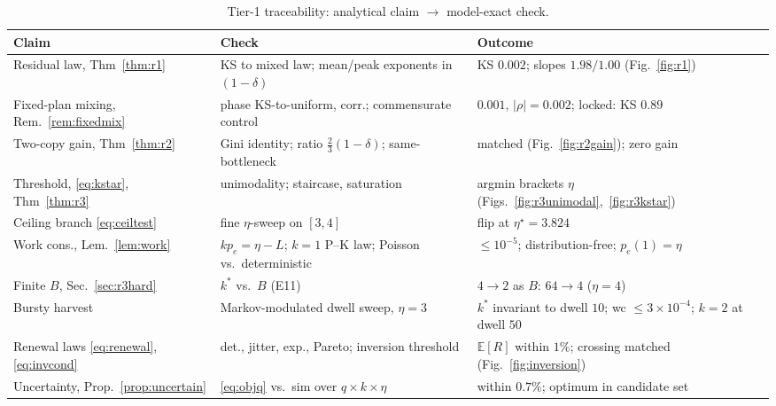 \documentclass[twocolumn,3p,times,procedia]{elsarticle}
\newcommand{\E}{\mathbb{E}}
\newcommand{\peff}{p_e}
\newcommand{\kstar}{k^{\ast}}
\begin{document}
\begin{table}[t]
\caption{Tier-1 traceability: analytical claim $\to$ model-exact check.}
\label{tab:tier1}
\centering
\renewcommand{\arraystretch}{1.18}
\setlength{\tabcolsep}{3pt}
\footnotesize
\begin{tabular}{>{\raggedright\arraybackslash}p{}>{\raggedright\arraybackslash}p{}>{\raggedright\arraybackslash}p{}}
\hline
Claim & Check & Outcome \\
\hline
Residual law, Thm~\ref{thm:r1} & KS to mixed law; mean/peak exponents in $(1{-}\delta)$ & KS $0.002$; slopes $1.98/1.00$ (Fig.~\ref{fig:r1}) \\
Fixed-plan mixing, Rem.~\ref{rem:fixedmix} & phase KS-to-uniform, corr.; commensurate control & $0.001$, $|\rho|{=}0.002$; locked: KS $0.89$ \\
Two-copy gain, Thm~\ref{thm:r2} & Gini identity; ratio $\tfrac23(1{-}\delta)$; same-bottleneck & matched (Fig.~\ref{fig:r2gain}); zero gain \\
Threshold, \eqref{eq:kstar}, Thm~\ref{thm:r3} & unimodality; staircase, saturation & argmin brackets $\eta$ (Figs.~\ref{fig:r3unimodal},~\ref{fig:r3kstar}) \\
Ceiling branch \eqref{eq:ceiltest} & fine $\eta$-sweep on $[3,4]$ & flip at $\eta^\star{=}3.824$ \\
Work cons., Lem.~\ref{lem:work} & $k\peff{=}\eta{-}L$; $k{=}1$ P--K law; Poisson vs.\ deterministic & $\le\!10^{-5}$; distribution-free; $\peff(1){=}\eta$ \\
Finite $B$, Sec.~\ref{sec:r3hard} & $\kstar$ vs.\ $B$ (E11) & $4\to2$ as $B$: $64\to4$ ($\eta{=}4$) \\
Bursty harvest & Markov-modulated dwell sweep, $\eta{=}3$ & $\kstar$ invariant to dwell $10$; wc $\le\!3{\times}10^{-4}$; $k{=}2$ at dwell $50$ \\
Renewal laws \eqref{eq:renewal},\newline\eqref{eq:invcond} & det., jitter, exp., Pareto; inversion threshold & $\E[R]$ within $1\%$; crossing matched (Fig.~\ref{fig:inversion}) \\
Uncertainty, Prop.~\ref{prop:uncertain} & \eqref{eq:objq} vs.\ sim over $q{\times}k{\times}\eta$ & within $0.7\%$; optimum in candidate set \\
\hline
\end{tabular}
\end{table}


\end{document}

